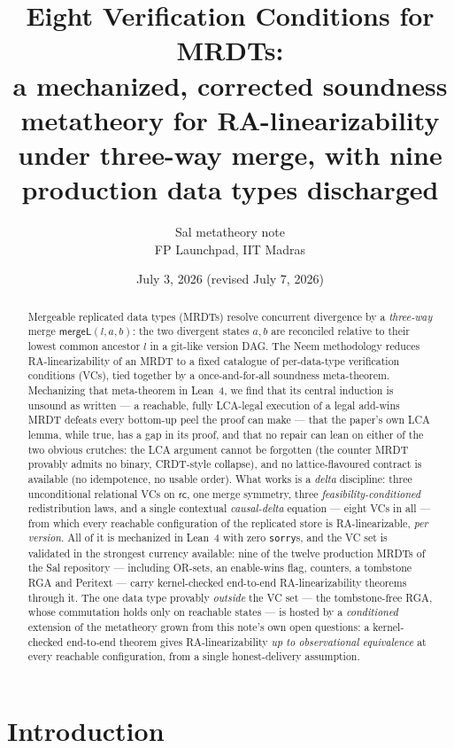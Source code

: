 \documentclass[11pt]{article}
\title{\bfseries Eight Verification Conditions for MRDTs:\\
\large a mechanized, corrected soundness metatheory for RA-linearizability
under three-way merge, with nine production data types discharged}
\author{Sal metatheory note\\ \small FP Launchpad, IIT Madras}
\date{July 3, 2026 (revised July 7, 2026)}
\newcommand{\mergeL}{\mathsf{mergeL}}
\newcommand{\lean}[1]{\texttt{#1}}
\begin{document}
\maketitle

\begin{abstract}
\noindent
Mergeable replicated data types (MRDTs) resolve concurrent divergence by a
\emph{three-way} merge $\mergeL(l,a,b)$: the two divergent states $a,b$
are reconciled relative to their lowest common ancestor $l$ in a git-like
version DAG. The Neem methodology reduces RA-linearizability of an MRDT to
a fixed catalogue of per-data-type verification conditions (VCs), tied
together by a once-and-for-all soundness meta-theorem. Mechanizing that
meta-theorem in Lean~4, we find that its central induction is unsound as
written --- a reachable, fully LCA-legal execution of a legal add-wins
MRDT defeats every bottom-up peel the proof can make --- that the paper's
own LCA lemma, while true, has a gap in its proof, and that no repair can
lean on either of the two obvious crutches: the LCA argument cannot be
forgotten (the counter MRDT provably admits no binary, CRDT-style
collapse), and no lattice-flavoured contract is available (no idempotence,
no usable order). What works
is a \emph{delta} discipline: three unconditional relational VCs on
$\mathsf{rc}$, one merge symmetry, three \emph{feasibility-conditioned}
redistribution laws, and a single contextual \emph{causal-delta} equation
--- eight VCs in all --- from which every reachable configuration of the
replicated store is RA-linearizable, \emph{per version}. All of it is
mechanized in Lean~4 with zero \lean{sorry}s, and the VC set is validated
in the strongest currency available: nine of the twelve production MRDTs
of the Sal repository --- including OR-sets, an enable-wins flag,
counters, a tombstone RGA and Peritext --- carry kernel-checked
end-to-end RA-linearizability theorems through it. The one data type
provably \emph{outside} the VC set --- the tombstone-free RGA, whose
commutation holds only on reachable states --- is hosted by a
\emph{conditioned} extension of the metatheory grown from this note's own
open questions: a kernel-checked end-to-end theorem gives
RA-linearizability \emph{up to observational equivalence} at every
reachable configuration, from a single honest-delivery assumption.
\end{abstract}

\tableofcontents

\section{Introduction}
\end{document}
